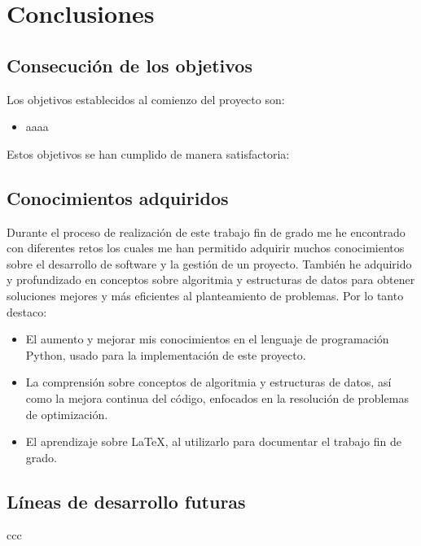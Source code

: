 
\chapter{Conclusiones} %

\label{Chapter6} %


\section{Consecución de los objetivos}

Los objetivos establecidos al comienzo del proyecto son:

\begin{itemize}
  \item aaaa
\end{itemize}

Estos objetivos se han cumplido de manera satisfactoria:


\section{Conocimientos adquiridos}

Durante el proceso de realización de este trabajo fin de grado me he encontrado con diferentes retos los cuales me han permitido adquirir muchos conocimientos sobre el desarrollo de software y la gestión de un proyecto. También he adquirido y profundizado en conceptos sobre algoritmia y estructuras de datos para obtener soluciones mejores y más eficientes al planteamiento de problemas. Por lo tanto destaco:

\begin{itemize}
  \item El aumento y mejorar mis conocimientos en el lenguaje de programación Python, usado para la implementación de este proyecto.
  \item La comprensión sobre conceptos de algoritmia y estructuras de datos, así como la mejora continua del código, enfocados en la resolución de problemas de optimización.
  \item El aprendizaje sobre \LaTeX, al utilizarlo para documentar el trabajo fin de grado.
\end{itemize}

\section{Líneas de desarrollo futuras}
ccc
